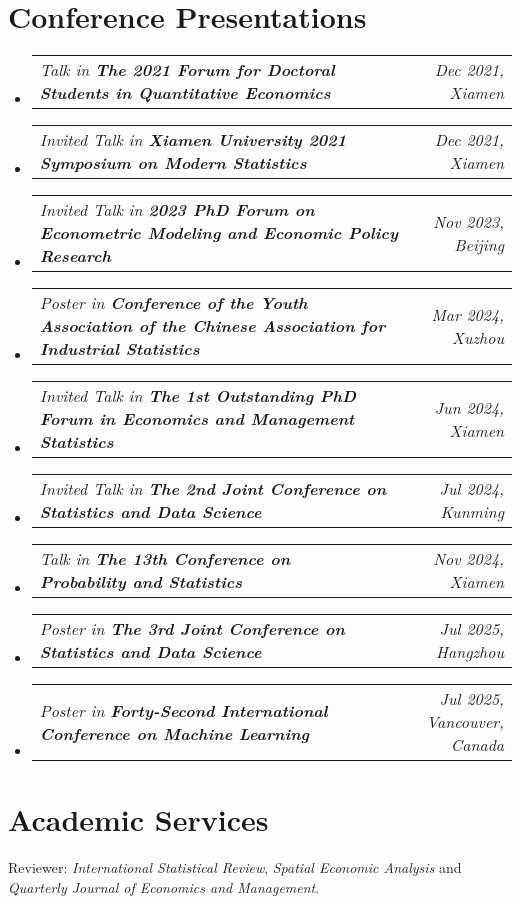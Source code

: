 \documentclass[letterpaper,10pt]{article}
\makeatletter
\newcommand{\resumeSubSubheading}[2]{
    \item
    \begin{tabular*}{0.97\textwidth}{l@{\extracolsep{\fill}}r}
      \textit{\small#1} & \textit{\small #2} \\
    \end{tabular*}\vspace{-7pt}
}
\newcommand{\resumeSubHeadingListStart}{\begin{itemize}[leftmargin=0.15in, label={}]}
\newcommand{\resumeSubHeadingListEnd}{\end{itemize}}
\makeatother
\begin{document}
\section{Conference Presentations}
\resumeSubHeadingListStart
    \resumeSubSubheading
        {Talk in \textbf{The 2021 Forum for Doctoral Students in Quantitative Economics}}{Dec 2021, Xiamen}
    \resumeSubSubheading
        {Invited Talk in \textbf{Xiamen University 2021 Symposium on Modern Statistics}}{Dec 2021, Xiamen}
    \resumeSubSubheading
        {Invited Talk in \textbf{2023 PhD Forum on Econometric Modeling and Economic Policy Research}}{Nov 2023, Beijing}
    \resumeSubSubheading
        {Poster in \textbf{Conference of the Youth Association of the Chinese Association for Industrial Statistics}}{Mar 2024, Xuzhou}
    \resumeSubSubheading
        {Invited Talk in \textbf{The 1st Outstanding PhD Forum in Economics and Management Statistics}}{Jun 2024, Xiamen}
    \resumeSubSubheading
        {Invited Talk in \textbf{The 2nd Joint Conference on Statistics and Data Science}}{Jul 2024, Kunming}
    \resumeSubSubheading
        {Talk in \textbf{The 13th Conference on Probability and Statistics}}{Nov 2024, Xiamen}
    \resumeSubSubheading
        {Poster in \textbf{The 3rd Joint Conference on Statistics and Data Science}}{Jul 2025, Hangzhou}
    \resumeSubSubheading
        {Poster in \textbf{Forty-Second International Conference on Machine Learning}}{Jul 2025, Vancouver, Canada}
\resumeSubHeadingListEnd


  \section{Academic Services}
  Reviewer: \textit{International Statistical Review}, \textit{Spatial Economic Analysis} and \textit{Quarterly Journal of Economics and Management}.
\end{document}
